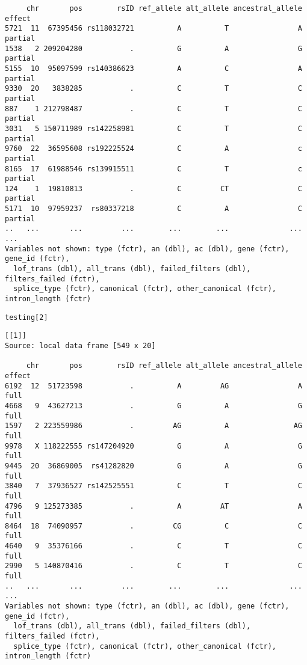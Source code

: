 \documentclass[9pt,english]{extarticle}\usepackage[]{graphicx}\usepackage[]{color}
\makeatletter
\newcommand{\hlnum}[1]{\textcolor[rgb]{0.686,0.059,0.569}{#1}}%
\newcommand{\hlstd}[1]{\textcolor[rgb]{0.345,0.345,0.345}{#1}}%
\newenvironment{kframe}{%
 \def\at@end@of@kframe{}%
 \ifinner\ifhmode%
  \def\at@end@of@kframe{\end{minipage}}%
  \begin{minipage}{\columnwidth}%
 \fi\fi%
 \def\FrameCommand##1{\hskip\@totalleftmargin \hskip-\fboxsep
 \colorbox{shadecolor}{##1}\hskip-\fboxsep
     \hskip-\linewidth \hskip-\@totalleftmargin \hskip\columnwidth}%
 \MakeFramed {\advance\hsize-\width
   \@totalleftmargin\z@ \linewidth\hsize
   \@setminipage}}%
 {\par\unskip\endMakeFramed%
 \at@end@of@kframe}
\newenvironment{knitrout}{}{} %
\makeatother
\begin{document}
\begin{linenumbers}
\begin{knitrout}
\begin{kframe}
\begin{verbatim}
     chr       pos        rsID ref_allele alt_allele ancestral_allele  effect
5721  11  67395456 rs118032721          A          T                A partial
1538   2 209204280           .          G          A                G partial
5155  10  95097599 rs140386623          A          C                A partial
9330  20   3838285           .          C          T                C partial
887    1 212798487           .          C          T                C partial
3031   5 150711989 rs142258981          C          T                C partial
9760  22  36595608 rs192225524          C          A                c partial
8165  17  61988546 rs139915511          C          T                c partial
124    1  19810813           .          C         CT                C partial
5171  10  97959237  rs80337218          C          A                C partial
..   ...       ...         ...        ...        ...              ...     ...
Variables not shown: type (fctr), an (dbl), ac (dbl), gene (fctr), gene_id (fctr),
  lof_trans (dbl), all_trans (dbl), failed_filters (dbl), filters_failed (fctr),
  splice_type (fctr), canonical (fctr), other_canonical (fctr), intron_length (fctr)
\end{verbatim}
\begin{alltt}
\hlstd{testing[}\hlnum{2}\hlstd{]}
\end{alltt}
\begin{verbatim}
[[1]]
Source: local data frame [549 x 20]

     chr       pos        rsID ref_allele alt_allele ancestral_allele effect
6192  12  51723598           .          A         AG                A   full
4668   9  43627213           .          G          A                G   full
1597   2 223559986           .         AG          A               AG   full
9978   X 118222555 rs147204920          G          A                G   full
9445  20  36869005  rs41282820          G          A                G   full
3840   7  37936527 rs142525551          C          T                C   full
4796   9 125273385           .          A         AT                A   full
8464  18  74090957           .         CG          C                C   full
4640   9  35376166           .          C          T                C   full
2990   5 140870416           .          C          T                C   full
..   ...       ...         ...        ...        ...              ...    ...
Variables not shown: type (fctr), an (dbl), ac (dbl), gene (fctr), gene_id (fctr),
  lof_trans (dbl), all_trans (dbl), failed_filters (dbl), filters_failed (fctr),
  splice_type (fctr), canonical (fctr), other_canonical (fctr), intron_length (fctr)
\end{verbatim}
\end{kframe}
\end{knitrout}


\end{linenumbers}
\end{document}
